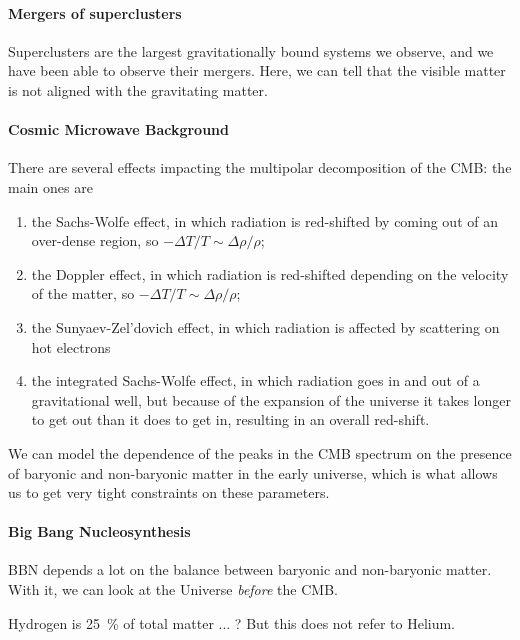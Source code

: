 \documentclass[main.tex]{subfiles}
\begin{document}
\paragraph{Mergers of superclusters}

Superclusters are the largest gravitationally bound systems we observe, and 
we have been able to observe their mergers. 
Here, we can tell that the visible matter is not aligned with the gravitating matter. 

\paragraph{Cosmic Microwave Background}

There are several effects impacting the multipolar decomposition of the CMB: 
the main ones are 
\begin{enumerate}
    \item the Sachs-Wolfe effect, in which radiation is red-shifted 
    by coming out of an over-dense region, so \(-\Delta T / T \sim \Delta \rho / \rho \);
    \item the Doppler effect, in which radiation is red-shifted depending on
    the velocity of the matter, so \(- \Delta T / T \sim \Delta \rho / \rho \);
    \item the Sunyaev-Zel'dovich effect, in which radiation is affected by 
    scattering on hot electrons
    \item the integrated Sachs-Wolfe effect, in which radiation goes in and out
    of a gravitational well, but because of the expansion of the universe it takes 
    longer to get out than it does to get in, resulting in an overall red-shift. 
\end{enumerate}

We can model the dependence of the peaks in the CMB spectrum on the presence of
baryonic and non-baryonic matter in the early universe, which is what allows us to get 
very tight constraints on these parameters.

\paragraph{Big Bang Nucleosynthesis}

BBN depends a lot on the balance between baryonic and non-baryonic matter.
With it, we can look at the Universe \emph{before} the CMB. 

Hydrogen is \SI{25}{\percent} of total matter ... ?
But this does not refer to Helium. 
\end{document}
